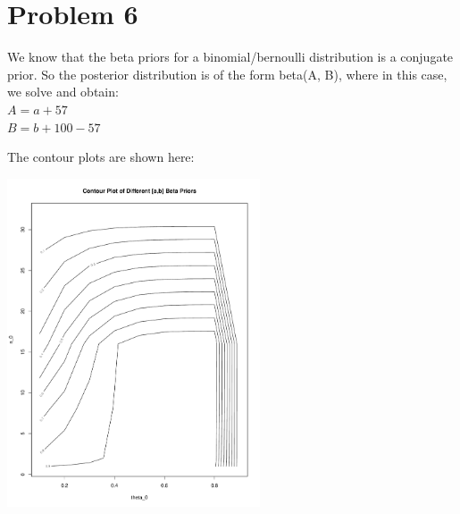 \documentclass{article}
\begin{document}
\section{Problem 6}
We know that the beta priors for a binomial/bernoulli distribution is a conjugate prior. So the posterior distribution is of the form beta(A, B), where in this case, we solve and obtain: \\
$A = a+57$\\
$B = b+100-57$

The contour plots are shown here:

\includegraphics[width=75mm, scale=0.8]{6plot.pdf}
\end{document}
